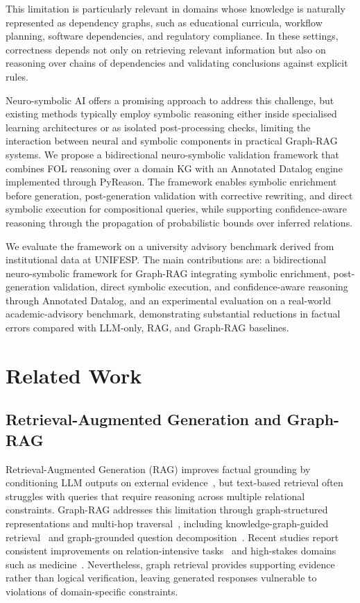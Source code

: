 \documentclass[runningheads]{llncs}
\begin{document}
This limitation is particularly relevant in domains whose knowledge is naturally represented as dependency graphs, such as educational curricula, workflow planning, software dependencies, and regulatory compliance. In these settings, correctness depends not only on retrieving relevant information but also on reasoning over chains of dependencies and validating conclusions against explicit rules.

Neuro-symbolic AI offers a promising approach to address this challenge, but existing methods typically employ symbolic reasoning either inside specialised learning architectures or as isolated post-processing checks, limiting the interaction between neural and symbolic components in practical Graph-RAG systems. We propose a bidirectional neuro-symbolic validation framework that combines FOL reasoning over a domain KG with an Annotated Datalog engine implemented through PyReason. The framework enables symbolic enrichment before generation, post-generation validation with corrective rewriting, and direct symbolic execution for compositional queries, while supporting confidence-aware reasoning through the propagation of probabilistic bounds over inferred relations.

We evaluate the framework on a university advisory benchmark derived from institutional data at UNIFESP. The main contributions are: a bidirectional neuro-symbolic framework for Graph-RAG integrating symbolic enrichment, post-generation validation, direct symbolic execution, and confidence-aware reasoning through Annotated Datalog, and an experimental evaluation on a real-world academic-advisory benchmark, demonstrating substantial reductions in factual errors compared with LLM-only, RAG, and Graph-RAG baselines.


\section{Related Work}

\subsection{Retrieval-Augmented Generation and Graph-RAG}

Retrieval-Augmented Generation (RAG) improves factual grounding by conditioning LLM outputs on external evidence~\cite{cheng2025,brown2025}, but text-based retrieval often struggles with queries that require reasoning across multiple relational constraints. Graph-RAG addresses this limitation through graph-structured representations and multi-hop traversal~\cite{zhang2025}, including knowledge-graph-guided retrieval~\cite{zhu2025} and graph-grounded question decomposition~\cite{linders2025}. Recent studies report consistent improvements on relation-intensive tasks~\cite{han2025} and high-stakes domains such as medicine~\cite{wu2024}. Nevertheless, graph retrieval provides supporting evidence rather than logical verification, leaving generated responses vulnerable to violations of domain-specific constraints.
\end{document}
